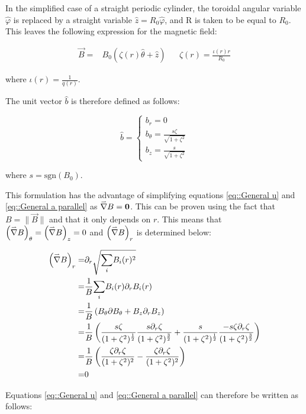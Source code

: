 In the simplified case of a straight periodic cylinder, the toroidal angular variable $\hat{\varphi}$ is replaced by a straight variable $\hat{z} = R_0 \hat{\varphi}$, and R is taken to be equal to $R_0$. This leaves the following expression for the magnetic field:

\begin{align}
 \vec{B}=&B_0\left(\zeta(r)\hat{\theta}+\hat{z}\right) && \zeta(r)=\frac{\iota(r)r}{R_0}
\end{align}

where $\iota(r)=\frac{1}{q(r)}$.

The unit vector $\hat{b}$ is therefore defined as follows:

\begin{equation}\label{eq::magnetic unit}
\hat{b}=
\begin{cases}
 b_r=0\\
 b_\theta=\frac{s\zeta}{\sqrt{1+\zeta^2}}\\
 b_z=\frac{s}{\sqrt{1+\zeta^2}}
\end{cases}
\end{equation}

where $s=\text{sgn}(B_0)$.

This formulation has the advantage of simplifying equations \ref{eq::General u} and \ref{eq::General a parallel} as $\accentset{\rightharpoonup}{\nabla} B=\boldsymbol{0}$. This can be proven using the fact that $B=\|\vec{B}\|$ and that it only depends on $r$. This means that $\left(\accentset{\rightharpoonup}{\nabla} B\right)_\theta = \left(\accentset{\rightharpoonup}{\nabla} B\right)_z = 0$ and $\left(\accentset{\rightharpoonup}{\nabla} B\right)_r$ is determined below:

\begin{align*}
 \left(\accentset{\rightharpoonup}{\nabla} B\right)_r =& \partial_r \sqrt{\underset{i}{\sum}B_i(r)^2}\\
 =&\frac{1}{B}\underset{i}{\sum} B_i(r) \partial_r B_i(r)\\
 =& \frac{1}{B}\left( B_\theta \partial B_\theta + B_z \partial_r B_z\right)\\
 =& \frac{1}{B}\left( \frac{s\zeta}{(1+\zeta^2)^{\frac{1}{2}}}\frac{s\partial_r\zeta}{(1+\zeta^2)^{\frac{3}{2}}} + \frac{s}{(1+\zeta^2)^{\frac{1}{2}}}\frac{-s\zeta\partial_r\zeta}{(1+\zeta^2)^{\frac{3}{2}}}\right)\\
 =& \frac{1}{B}\left( \frac{\zeta\partial_r\zeta}{(1+\zeta^2)^2}-\frac{\zeta\partial_r\zeta}{(1+\zeta^2)^2}\right)\\
 =& 0
\end{align*}

Equations \ref{eq::General u} and \ref{eq::General a parallel} can therefore be written as follows:

